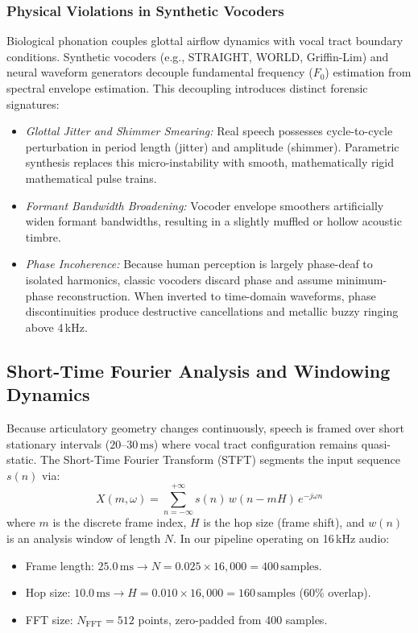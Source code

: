 \documentclass[runningheads]{llncs}
\begin{document}
\subsubsection{Physical Violations in Synthetic Vocoders}
Biological phonation couples glottal airflow dynamics with vocal tract boundary conditions. Synthetic vocoders (e.g., STRAIGHT, WORLD, Griffin-Lim) and neural waveform generators decouple fundamental frequency ($F_0$) estimation from spectral envelope estimation. This decoupling introduces distinct forensic signatures:
\begin{itemize}
    \item \textit{Glottal Jitter and Shimmer Smearing:} Real speech possesses cycle-to-cycle perturbation in period length (jitter) and amplitude (shimmer). Parametric synthesis replaces this micro-instability with smooth, mathematically rigid mathematical pulse trains.
    \item \textit{Formant Bandwidth Broadening:} Vocoder envelope smoothers artificially widen formant bandwidths, resulting in a slightly muffled or hollow acoustic timbre.
    \item \textit{Phase Incoherence:} Because human perception is largely phase-deaf to isolated harmonics, classic vocoders discard phase and assume minimum-phase reconstruction. When inverted to time-domain waveforms, phase discontinuities produce destructive cancellations and metallic buzzy ringing above 4\,kHz.
\end{itemize}

\subsection{Short-Time Fourier Analysis and Windowing Dynamics}
Because articulatory geometry changes continuously, speech is framed over short stationary intervals ($20$--$30\,\text{ms}$) where vocal tract configuration remains quasi-static. The Short-Time Fourier Transform (STFT) segments the input sequence $s(n)$ via:
\begin{equation}
X(m, \omega) = \sum_{n=-\infty}^{+\infty} s(n) \, w(n - m H) \, e^{-j \omega n}
\label{eq:stft}
\end{equation}
where $m$ is the discrete frame index, $H$ is the hop size (frame shift), and $w(n)$ is an analysis window of length $N$. In our pipeline operating on 16\,kHz audio:
\begin{itemize}
    \item Frame length: $25.0\,\text{ms} \rightarrow N = 0.025 \times 16{,}000 = 400\,\text{samples}$.
    \item Hop size: $10.0\,\text{ms} \rightarrow H = 0.010 \times 16{,}000 = 160\,\text{samples}$ (60\% overlap).
    \item FFT size: $N_{\text{FFT}} = 512$ points, zero-padded from 400 samples.
\end{itemize}
\end{document}
